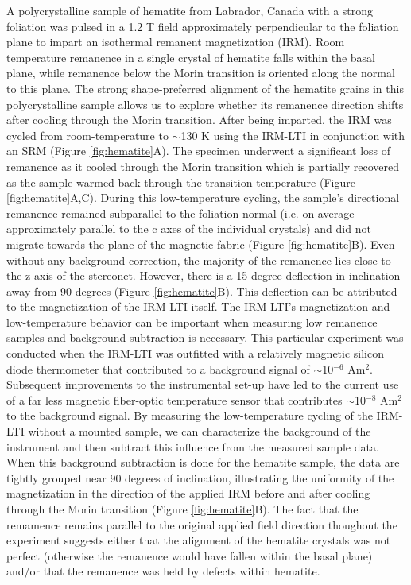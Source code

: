 \documentclass[draft,gc]{AGUTeX}
\begin{document}
\begin{article}
A polycrystalline sample of hematite from Labrador, Canada with a strong foliation was pulsed in a 1.2 T field approximately perpendicular to the foliation plane to impart an isothermal remanent magnetization (IRM). Room temperature remanence in a single crystal of hematite falls within the basal plane, while remanence below the Morin transition is oriented along the normal to this plane. The strong shape-preferred alignment of the hematite grains in this polycrystalline sample allows us to explore whether its remanence direction shifts after cooling through the Morin transition. After being imparted, the IRM was cycled from room-temperature to $\sim$130 K using the IRM-LTI in conjunction with an SRM (Figure \ref{fig:hematite}A). The specimen underwent a significant loss of remanence as it cooled through the Morin transition which is partially recovered as the sample warmed back through the transition temperature (Figure \ref{fig:hematite}A,C). During this low-temperature cycling, the sample's directional remanence remained subparallel to the foliation normal (i.e. on average approximately parallel to the c axes of the individual crystals) and did not migrate towards the plane of the magnetic fabric (Figure \ref{fig:hematite}B). Even without any background correction, the majority of the remanence lies close to the z-axis of the stereonet. However, there is a 15-degree deflection in inclination away from 90 degrees (Figure \ref{fig:hematite}B). This deflection can be attributed to the magnetization of the IRM-LTI itself. The IRM-LTI's magnetization and low-temperature behavior can be important when measuring low remanence samples and background subtraction is necessary. This particular experiment was conducted when the IRM-LTI was outfitted with a relatively magnetic silicon diode thermometer that contributed to a background signal of $\sim$10$^{-6}$ Am$^2$. Subsequent improvements to the instrumental set-up have led to the current use of a far less magnetic fiber-optic temperature sensor that contributes $\sim$10$^{-8}$ Am$^2$ to the background signal.  By measuring the low-temperature cycling of the IRM-LTI without a mounted sample, we can characterize the background of the instrument and then subtract this influence from the measured sample data. When this background subtraction is done for the hematite sample, the data are tightly grouped near 90 degrees of inclination, illustrating the uniformity of the magnetization in the direction of the applied IRM before and after cooling through the Morin transition (Figure \ref{fig:hematite}B). The fact that the remamence remains parallel to the original applied field direction thoughout the experiment suggests either that the alignment of the hematite crystals was not perfect (otherwise the remanence would have fallen within the basal plane) and/or that the remanence was held by defects within hematite.


\end{article}
\end{document}

